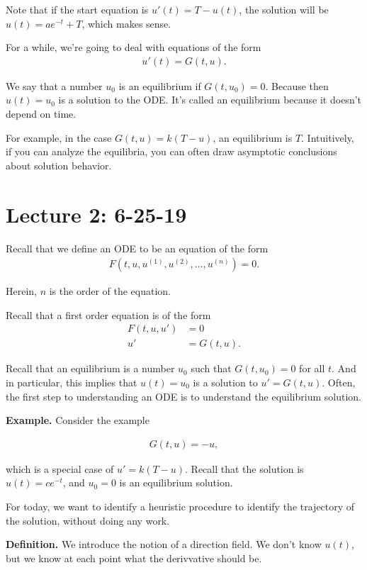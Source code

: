 \documentclass{article}
\begin{document}
Note that if the start equation is $u'(t) = T - u(t)$, the solution will be $u(t) = a e^{-t} + T$, which makes sense.

For a while, we're going to deal with equations of the form
\begin{align*}
  u'(t) = G(t, u).
\end{align*}

We say that a number $u_0$ is an equilibrium if $G(t, u_0) = 0$.  Because then  $u(t) = u_0$ is a solution to the ODE.  It's called an equilibrium because it doesn't depend on time.

For example, in the case $G(t, u) = k(T - u)$, an equilibrium is $T$.  Intuitively, if you can analyze the equilibria, you can often draw asymptotic conclusions about solution behavior.

\section{Lecture 2: 6-25-19}

Recall that we define an ODE to be an equation of the form
\begin{align*}
  F(t, u, u^{(1)}, u^{(2)}, \dots, u^{(n)}) = 0.
\end{align*}

Herein, $n$ is the order of the equation.

Recall that a first order equation is of the form
\begin{align*}
  F(t, u, u') &= 0 \\
  u' &= G(t, u).
\end{align*}

Recall that an equilibrium is a number $u_0$ such that $G(t, u_0) = 0$ for all $t$.  And in particular, this implies that $u(t) = u_0$ is a solution to $u' = G(t, u)$.  Often, the first step to understanding an ODE is to understand the equilibrium solution.

{\bf Example.} Consider the example

\begin{align*}
  G(t, u) = - u,
\end{align*}

which is a special case of $u' = k(T -u)$.  Recall that the solution is $u(t) = c e^{-t}$, and $u_0 = 0$ is an equilibrium solution.

For today, we want to identify a heuristic procedure to identify the trajectory of the solution, without doing any work.

{\bf Definition.} We introduce the notion of a direction field.  We don't know $u(t)$, but we know at each point what the derivvative should be.
\end{document}
